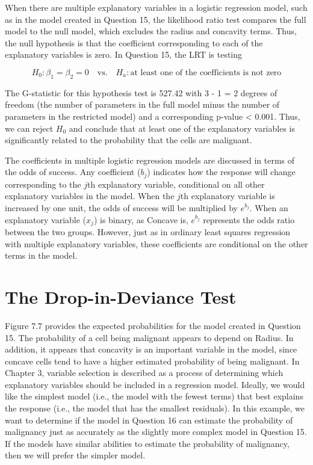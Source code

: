 \documentclass[
]{report}
\begin{document}
When there are multiple explanatory variables in a logistic regression model, such as in the model created in Question 15, the likelihood ratio test compares the full model to the null model, which excludes the radius and concavity terms. Thus, the null hypothesis is that the coefficient corresponding to each of the explanatory variables is zero. In Question 15, the LRT is testing

\[H_0: \beta_1 = \beta_2 = 0 \quad \text{vs.}\quad H_a: \text{at least one of the coefficients is not zero}\]

The G-statistic for this hypothesis test is 527.42 with 3 - 1 = 2 degrees of freedom (the number of parameters in the full model minus the number of parameters in the restricted model) and a corresponding p-value \textless{} 0.001. Thus, we can reject \(H_0\) and conclude that at least one of the explanatory variables is significantly related to the probability that the cells are malignant.

The coefficients in multiple logistic regression models are discussed in terms of the odds of success. Any coefficient (\(b_j\)) indicates how the response will change corresponding to the \(j\)th explanatory variable, conditional on all other explanatory variables in the model. When the \(j\)th explanatory variable is increased by one unit, the odds of success will be multiplied by \(e^{b_j}\). When an explanatory variable (\(x_j\)) is binary, as Concave is, \(e^{b_j}\) represents the odds ratio between the two groups. However, just as in ordinary least squares regression with multiple explanatory variables, these coefficients are conditional on the other terms in the model.

\section{\texorpdfstring{\textbf{The Drop-in-Deviance Test}}{The Drop-in-Deviance Test}}\label{the-drop-in-deviance-test}

Figure 7.7 provides the expected probabilities for the model created in Question 15. The probability of a cell being malignant appears to depend on Radius. In addition, it appears that concavity is an important variable in the model, since concave cells tend to have a higher estimated probability of being malignant. In Chapter 3, variable selection is described as a process of determining which explanatory variables should be included in a regression model. Ideally, we would like the simplest model (i.e., the model with the fewest terms) that best explains the response (i.e., the model that has the smallest residuals). In this example, we want to determine if the model in Question 16 can estimate the probability of malignancy just as accurately as the slightly more complex model in Question 15. If the models have similar abilities to estimate the probability of malignancy, then we will prefer the simpler model.
\end{document}
